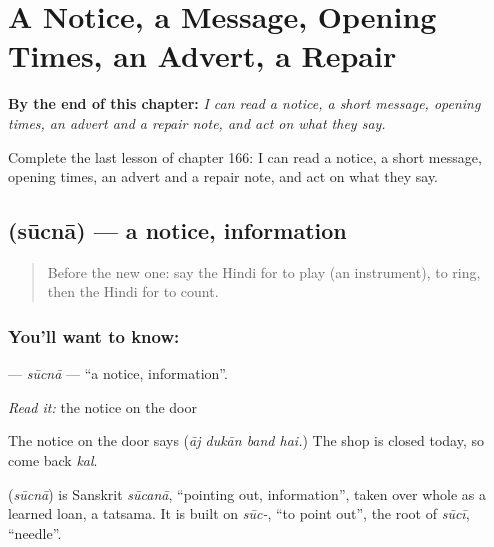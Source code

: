 
\chapter{A Notice, a Message, Opening Times, an Advert, a Repair}
\label{ch:hi-a-notice-a-message-opening-times-an-advert-a-repair}

\begin{chapteropening}
\textbf{By the end of this chapter:} \emph{I can read a notice, a short message, opening times, an advert and a repair note, and act on what they say.}

Complete the last lesson of chapter 166: I can read a notice, a short message, opening times, an advert and a repair note, and act on what they say.
\end{chapteropening}

\section[\texorpdfstring{\hi{सूचना} (sūcnā)}{सूचना (sūcnā)}]{ (sūcnā) — a notice, information}

\label{lesson:HI-C166-sucna}



\begin{quote}
Before the new one: say the Hindi for to play (an instrument), to ring, then the Hindi for to count.
\end{quote}

\subsection*{You'll want to know: }
\textbf{} — \emph{sūcnā} — \textquotedblleft{}a notice, information\textquotedblright{}.

\emph{Read it:} the notice on the door

The notice on the door says \textbf{   } (\emph{āj dukān band hai.}) The shop is closed today, so come back \emph{kal}.

\begin{cousinweb}
\textbf{} (\emph{sūcnā}) is Sanskrit \emph{sūcanā}, \textquotedblleft{}pointing out, information\textquotedblright{}, taken over whole as a learned loan, a tatsama. It is built on \emph{sūc-}, \textquotedblleft{}to point out\textquotedblright{}, the root of \emph{sūcī}, \textquotedblleft{}needle\textquotedblright{}.
\end{cousinweb}

